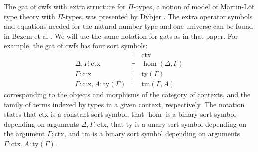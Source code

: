 \documentclass[11pt,a4paper]{article}
\theoremstyle{definition}
\newcommand{\ctx}{\mathrm{ctx}}
\newcommand{\ty}{\mathrm{ty}}
\newcommand{\tm}{\mathrm{tm}}
\begin{document}
The gat of cwfs with extra structure for $\Pi$-types, a notion of model of Martin-Löf type theory with $\Pi$-types, was presented by Dybjer \cite{dybjer:torino}. The extra operator symbols and equations needed for the natural number type and one universe can be found in Bezem et al \cite{bezem:hofmann}. We will use the same notation for gats as in that paper. For example, the gat of cwfs has four sort symbols:
\begin{eqnarray*}
&\vdash& \ctx\\
\Delta, \Gamma : \ctx&\vdash& \hom(\Delta,\Gamma)\\
\Gamma : \ctx&\vdash& \ty(\Gamma)\\
\Gamma : \ctx, A : \ty(\Gamma)&\vdash& \tm(\Gamma,A)
\end{eqnarray*}
corresponding to the objects and morphisms of the category of contexts, and the family of terms indexed by types in a given context, respectively. The notation states that $\ctx$ is a constant sort symbol, that $\hom$ is a binary sort symbol depending on arguments $\Delta, \Gamma : \ctx$, that $\ty$ is a unary sort symbol depending on the argument $\Gamma : \ctx$, and $\tm$ is a binary sort symbol depending on arguments $\Gamma : \ctx, A : \ty(\Gamma)$.
\end{document}
